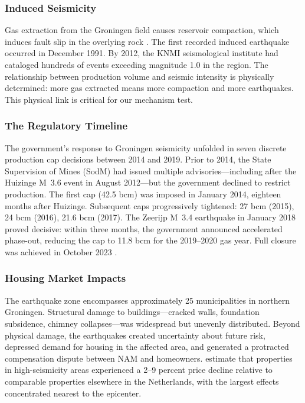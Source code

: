 \documentclass[12pt]{article}
\begin{document}
\subsubsection*{Induced Seismicity} Gas extraction from the Groningen field causes reservoir compaction, which induces fault slip in the overlying rock \citep{vanThienenVisser2017}. The first recorded induced earthquake occurred in December 1991. By 2012, the KNMI seismological institute had cataloged hundreds of events exceeding magnitude 1.0 in the region. The relationship between production volume and seismic intensity is physically determined: more gas extracted means more compaction and more earthquakes. This physical link is critical for our mechanism test.

\subsubsection*{The Regulatory Timeline} The government's response to Groningen seismicity unfolded in seven discrete production cap decisions between 2014 and 2019. Prior to 2014, the State Supervision of Mines (SodM) had issued multiple advisories---including after the Huizinge M~3.6 event in August 2012---but the government declined to restrict production. The first cap (42.5 bcm) was imposed in January 2014, eighteen months after Huizinge. Subsequent caps progressively tightened: 27 bcm (2015), 24 bcm (2016), 21.6 bcm (2017). The Zeerijp M~3.4 earthquake in January 2018 proved decisive: within three months, the government announced accelerated phase-out, reducing the cap to 11.8 bcm for the 2019--2020 gas year. Full closure was achieved in October 2023 \citep{rijksoverheid2018}.

\subsubsection*{Housing Market Impacts} The earthquake zone encompasses approximately 25 municipalities in northern Groningen. Structural damage to buildings---cracked walls, foundation subsidence, chimney collapses---was widespread but unevenly distributed. Beyond physical damage, the earthquakes created uncertainty about future risk, depressed demand for housing in the affected area, and generated a protracted compensation dispute between NAM and homeowners. \citet{bosker2019} estimate that properties in high-seismicity areas experienced a 2--9 percent price decline relative to comparable properties elsewhere in the Netherlands, with the largest effects concentrated nearest to the epicenter.
\end{document}
